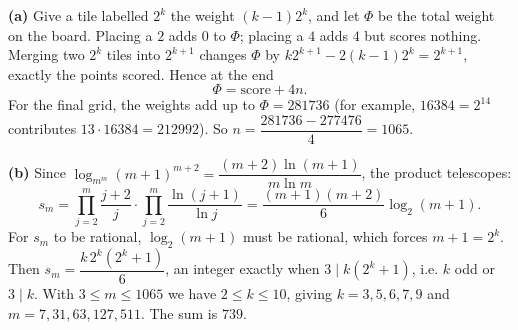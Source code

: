 \textbf{(a)} Give a tile labelled $2^k$ the weight $(k-1)2^k$, and let $\Phi$ be the total weight on the board. Placing a $2$ adds $0$ to $\Phi$; placing a $4$ adds $4$ but scores nothing. Merging two $2^k$ tiles into $2^{k+1}$ changes $\Phi$ by $k2^{k+1}-2(k-1)2^k=2^{k+1}$, exactly the points scored. Hence at the end
\[\Phi=\text{score}+4n.\]
For the final grid, the weights add up to $\Phi=281736$ (for example, $16384=2^{14}$ contributes $13\cdot16384=212992$). So $n=\dfrac{281736-277476}{4}=\boxed{1065}$.

\textbf{(b)} Since $\log_{m^m}(m+1)^{m+2}=\dfrac{(m+2)\ln(m+1)}{m\ln m}$, the product telescopes:
\[s_m=\prod_{j=2}^{m}\dfrac{j+2}{j}\cdot\prod_{j=2}^{m}\dfrac{\ln(j+1)}{\ln j}=\dfrac{(m+1)(m+2)}{6}\log_2(m+1).\]
For $s_m$ to be rational, $\log_2(m+1)$ must be rational, which forces $m+1=2^k$. Then $s_m=\dfrac{k\,2^k(2^k+1)}{6}$, an integer exactly when $3\mid k(2^k+1)$, i.e. $k$ odd or $3\mid k$. With $3\le m\le1065$ we have $2\le k\le10$, giving $k=3,5,6,7,9$ and $m=7,31,63,127,511$. The sum is $\boxed{739}$.
